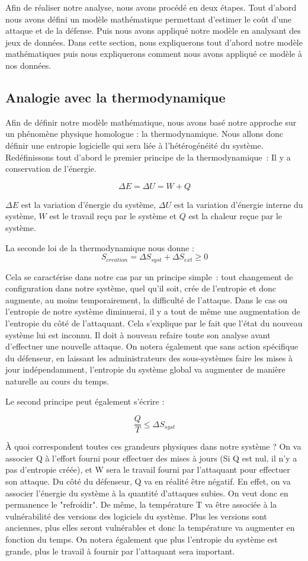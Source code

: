 
Afin de réaliser notre analyse, nous avons procédé en deux étapes.
Tout d'abord nous avons défini un modèle mathématique permettant d'estimer le coût d'une attaque et de la défense.
Puis nous avons appliqué notre modèle en analysant des jeux de données.
Dans cette section, nous expliquerons tout d'abord notre modèle mathématiques puis nous expliquerons comment nous avons appliqué ce modèle à nos données.


\subsection{Analogie avec la thermodynamique}

Afin de définir notre modèle mathématique, nous avons basé notre approche sur un phénomène physique homologue : la thermodynamique.
Nous allons donc définir une entropie logicielle qui sera liée à l'hétérogénéité du système.
Redéfinissons tout d'abord le premier principe de la thermodynamique~: Il y a conservation de l'énergie. 

\[
\Delta E = \Delta U = W + Q
\]

$\Delta E$ est la variation d'énergie du système, $\Delta U$ est la variation d'énergie interne du système, $W$ est le travail reçu par le système et $Q$ est la chaleur reçue par le système.

La seconde loi de la thermodynamique nous donne :
\[
S_{creation} = \Delta S_{syst} + \Delta S_{ext} \geq 0
\]

Cela se caractérise dans notre cas par un principe simple~: tout changement de configuration dans notre système, quel qu'il soit, crée de l'entropie et donc augmente, au moins temporairement, la difficulté de l'attaque.
Dans le cas ou l'entropie de notre système diminuerai, il y a tout de même une augmentation de l'entropie du côté de l'attaquant. Cela s'explique par le fait que l'état du nouveau système lui est inconnu. Il doit à nouveau refaire toute son analyse avant d'effectuer une nouvelle attaque. On notera également que sans action spécifique du défenseur, en laissant les administrateurs des sous-systèmes faire les mises à jour indépendamment, l'entropie du système global va augmenter de manière naturelle au cours du temps. 

Le second principe peut également s'écrire :

\[
\frac{Q}{T} \leq \Delta S_{syst}
\]

À quoi correspondent toutes ces grandeurs physiques dans notre système ? On va associer Q à l'effort fourni pour effectuer des mises à jours (Si Q est nul, il n'y a pas d'entropie créée), et W sera le travail fourni par l'attaquant pour effectuer son attaque. Du côté du défenseur, Q va en réalité être négatif. En effet, on va associer l'énergie du système à la quantité d'attaques subies. On veut donc en permanence le "refroidir".
De même, la température T va être associée à la vulnérabilité des versions des logiciels du système. Plus les versions sont anciennes, plus elles seront vulnérables et donc la température va augmenter en fonction du temps.
On notera également que plus l'entropie du système est grande, plus le travail à fournir par l'attaquant sera important.

